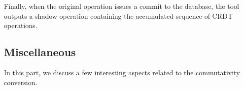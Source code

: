 
Finally, when the original operation issues a commit to the database,
the tool outputs a shadow operation containing the accumulated
sequence of CRDT operations.



\subsection{Miscellaneous}

In this part, we discuss a few interesting aspects related to the commutativity
conversion.

